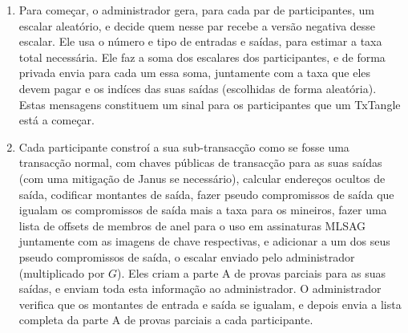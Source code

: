 \begin{enumerate}
    \item Para começar, o administrador gera, para cada par de participantes, um escalar aleatório, e decide quem nesse par recebe a versão negativa desse escalar. Ele usa o número e tipo de entradas e saídas, para estimar a taxa total necessária. Ele faz a soma dos escalares dos participantes, e de forma privada envia para cada um essa soma, juntamente com a taxa que eles devem pagar e os indíces das suas saídas (escolhidas de forma aleatória). Estas mensagens constituem um sinal para os participantes que um TxTangle está a começar.   
    \item Cada participante constroí a sua sub-transacção como se fosse uma transacção normal, com chaves públicas de transacção para as suas saídas (com uma mitigação de Janus se necessário), calcular endereços ocultos de saída, codificar montantes de saída, fazer pseudo compromissos de saída que igualam os compromissos de saída mais a taxa para os mineiros, fazer uma lista de offsets de membros de anel para o uso em assinaturas MLSAG juntamente com as imagens de chave respectivas, e adicionar a um dos seus pseudo compromissos de saída, o escalar enviado pelo administrador (multiplicado por $G$). Eles criam a parte A de provas parciais para as suas saídas, e enviam toda esta informação ao administrador. O administrador verifica que os montantes de entrada e saída se igualam, e depois envia a lista completa da parte A de provas parciais a cada participante.      


\end{enumerate}
